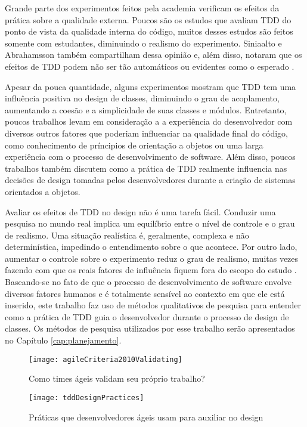 Grande parte dos experimentos feitos pela academia verificam os
efeitos da prática sobre a qualidade externa. Poucos são os estudos que avaliam TDD do
ponto de vista da qualidade interna do código, muitos desses estudos
são feitos somente com estudantes, diminuindo o realismo do experimento. 
Siniaalto e Abrahamsson também
compartilham dessa opinião e, além disso, notaram que os efeitos de TDD podem 
não ser tão automáticos ou evidentes como o esperado \cite{alarming-results}.

Apesar da pouca quantidade, alguns experimentos mostram que TDD tem uma influência
positiva no design de classes, diminuindo o grau de acoplamento, aumentando
a coesão e a simplicidade de suas classes e módulos. Entretanto, poucos trabalhos
levam em consideração a a experiência do desenvolvedor com diversos
outros fatores que poderiam influenciar na qualidade final do código, como conhecimento
de príncipios de orientação a objetos ou uma larga experiência com o processo de 
desenvolvimento de software. Além disso, poucos trabalhos também discutem como
a prática de TDD realmente influencia 
nas decisões de design tomadas pelos desenvolvedores durante a criação de sistemas 
orientados a objetos.

Avaliar os efeitos de TDD no design não é uma tarefa fácil.
Conduzir uma pesquisa no mundo real implica um equilíbrio entre
o nível de controle e o grau de realismo. Uma situação realística é, geralmente, complexa e 
não determinística, impedindo o entendimento sobre o que acontece. Por outro
lado, aumentar o controle sobre o experimento reduz o grau de realismo, muitas
vezes fazendo com que os reais fatores de influência fiquem fora do escopo do 
estudo \cite{guidelines-case-study}.
Baseando-se no fato de que o processo de desenvolvimento de software envolve 
diversos fatores humanos e é totalmente sensível ao contexto em que ele está 
inserido, este trabalho faz uso de métodos qualitativos de pesquisa 
para entender como a prática de TDD guia o desenvolvedor durante 
o processo de design de classes.
Os métodos de pesquisa utilizados por
esse trabalho serão apresentados no Capítulo \ref{cap:planejamento}.

\begin{figure}[ht]
  \begin{minipage}[b]{0.45\linewidth}
    \centering
    \texttt{[image: agileCriteria2010Validating]}
    \caption{Como times ágeis validam seu próprio trabalho?}
    \label{fig:wambler-agile-2010}
  \end{minipage}
  \hspace{0.5cm}
  \begin{minipage}[b]{0.45\linewidth}
    \centering
    \texttt{[image: tddDesignPractices]}
    \caption{Práticas que desenvolvedores ágeis usam para auxiliar no design}  
    \label{fig:wambler-tdd-2008}
  \end{minipage}
\end{figure}			

